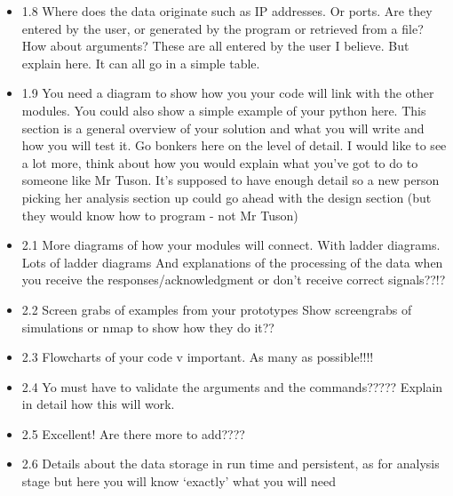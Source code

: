 \documentclass{article}
\begin{document}
\begin{itemize}
  \item{1.8 Where does the data originate such as IP addresses. Or ports. Are they entered by the user, or generated by the program or retrieved from a file? How about arguments? These are all entered by the user I believe. But explain here. It can all go in a simple table. }

  \item{1.9 You need a diagram to show how you your code will link with the other modules.  You could also show a simple example of your python here. This section is a general overview of your solution and what you will write and how you will test it. Go bonkers here on the level of detail. I would like to see a lot more, think about how you would explain what you’ve got to do to someone like Mr Tuson. It’s supposed to have enough detail so a new person picking her analysis section up could go ahead with the design section (but they would know how to program - not Mr Tuson)}

  \item{2.1 More diagrams of how your modules will connect. With ladder diagrams.  Lots of ladder diagrams And explanations of the processing of the data when you receive the responses/acknowledgment or don’t receive correct signals??!?}

  \item{2.2 Screen grabs of examples from your prototypes  Show screengrabs of simulations or nmap to show how they do it??}

  \item{2.3 Flowcharts of your code v important.  As many as possible!!!!}

  \item{2.4 Yo must have to validate the arguments and the commands????? Explain in detail how this will work. }

  \item{2.5 Excellent! Are there more to add????}

  \item{2.6 Details about the data storage in run time and persistent, as for analysis stage but here you will know ‘exactly’ what you will need }

\end{itemize}
\end{document}
